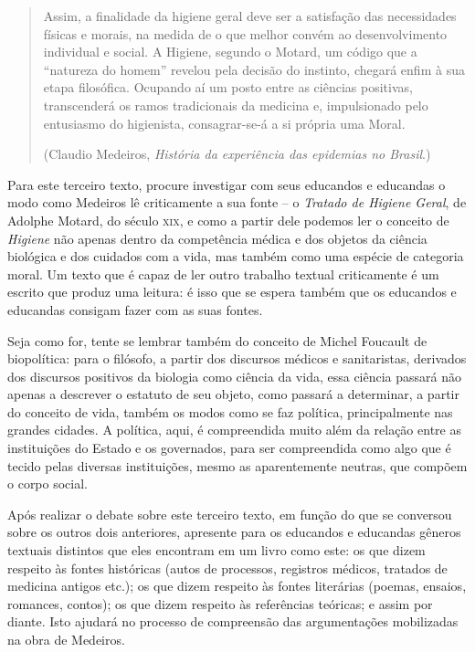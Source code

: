 \documentclass[12pt]{extarticle}
\begin{document}
\begin{enumerate}
\begin{quote}
Assim, a finalidade da higiene geral deve ser a satisfação das
necessidades físicas e morais, na medida de o que melhor convém ao
desenvolvimento individual e social. A Higiene, segundo o Motard, um
código que a ``natureza do homem'' revelou pela decisão do instinto,
chegará enfim à sua etapa filosófica. Ocupando aí um posto entre as
ciências positivas, transcenderá os ramos tradicionais da medicina e,
impulsionado pelo entusiasmo do higienista, consagrar-se-á a si própria
uma Moral.

(Claudio Medeiros, \emph{História da experiência das epidemias no Brasil}.)
\end{quote}

Para este terceiro texto, procure investigar com seus educandos e
educandas o modo como Medeiros lê criticamente a sua fonte -- o
\emph{Tratado de Higiene Geral}, de Adolphe Motard, do século \textsc{xix}, e
como a partir dele podemos ler o conceito de \emph{Higiene} não apenas dentro
da competência médica e dos objetos da ciência biológica e dos cuidados
com a vida, mas também como uma espécie de categoria moral. Um texto que
é capaz de ler outro trabalho textual criticamente é um escrito que
produz uma leitura: é isso que se espera também que os educandos e
educandas consigam fazer com as suas fontes.

Seja como for, tente se lembrar também do conceito de Michel Foucault de
biopolítica: para o filósofo, a partir dos discursos médicos e
sanitaristas, derivados dos discursos positivos da biologia como ciência
da vida, essa ciência passará não apenas a descrever o estatuto de seu
objeto, como passará a determinar, a partir do conceito de vida, também
os modos como se faz política, principalmente nas grandes cidades. A
política, aqui, é compreendida muito além da relação entre as
instituições do Estado e os governados, para ser compreendida como algo
que é tecido pelas diversas instituições, mesmo as aparentemente
neutras, que compõem o corpo social.

Após realizar o debate sobre este terceiro texto, em função do que se
conversou sobre os outros dois anteriores, apresente para os educandos e
educandas gêneros textuais distintos que eles encontram em um livro como
este: os que dizem respeito às fontes históricas (autos de processos,
registros médicos, tratados de medicina antigos etc.); os que dizem
respeito às fontes literárias (poemas, ensaios, romances, contos); os
que dizem respeito às referências teóricas; e assim por diante. Isto
ajudará no processo de compreensão das argumentações mobilizadas na obra
de Medeiros.
\end{enumerate}
\end{document}
